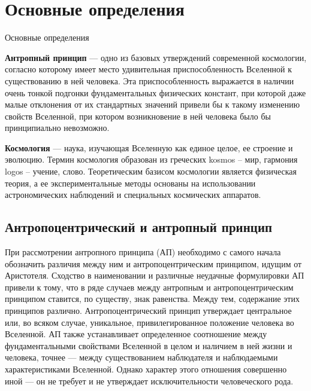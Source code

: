 \chapter{Основные определения} \label{chapt1}




Основные определения


\textbf{Антропный принцип} --- одно из базовых утверждений современной космологии, согласно которому имеет место удивительная приспособленность Вселенной к существованию в ней человека. Эта приспособленность выражается в наличии очень тонкой подгонки фундаментальных физических констант, при которой даже малые отклонения от их стандартных значений привели бы к такому изменению свойств Вселенной, при котором возникновение в ней человека было бы принципиально невозможно.
     

\textbf{Космология} --- наука, изучающая Вселенную как единое целое, ее строение и эволюцию. Термин космология образован из греческих kosmos – мир, гармония logos – учение, слово. Теоретическим базисом космологии является физическая теория, а ее экспериментальные методы основаны на использовании астрономических наблюдений и специальных космических аппаратов.

\section{Антропоцентрический и антропный принцип} \label{sect1_1}

При рассмотрении антропного принципа (АП) необходимо с самого начала обозначить различия между ним и антропоцентрическим принципом, идущим от Аристотеля. Сходство в наименовании и различные неудачные формулировки АП привели к тому, что в ряде случаев между антропным и антропоцентрическим принципом ставится, по существу, знак равенства. Между тем, содержание этих принципов различно. Антропоцентрический принцип утверждает центральное или, во всяком случае, уникальное, привилегированное положение человека во Вселенной. АП также устанавливает определенное соотношение между фундаментальными свойствами Вселенной в целом и наличием в ней жизни и человека, точнее --- между существованием наблюдателя и наблюдаемыми характеристиками Вселенной. Однако характер этого отношения совершенно иной --- он не требует и не утверждает исключительности человеческого рода.



\clearpage
